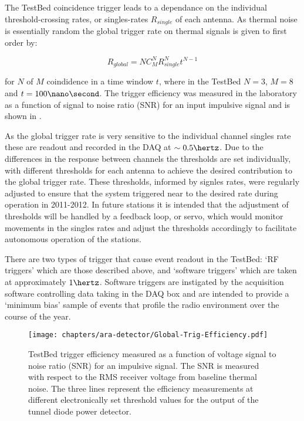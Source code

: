 The TestBed coincidence trigger leads to a dependance on the individual threshold-crossing rates, or singles-rates $R_{single}$ of each antenna. As thermal noise is essentially random the global trigger rate on thermal signals is given to first order by:


\begin{equation}
  R_{global} = N C^{N}_{M}R_{single}^{N}t^{N-1}
  \label{eq:ara-detector:TestBed:Trigger-Rate}
\end{equation}

\noindent for $N$ of $M$ coindidence in a time window $t$, where in the TestBed $N=3$, $M=8$ and $t=100\nano\second$. The trigger efficiency was measured in the laboratory as a function of signal to noise ratio (SNR) for an input impulsive signal and is shown in .

As the global trigger rate is very sensitive to the individual channel singles rate these are readout and recorded in the DAQ at $\sim 0.5 \hertz$. Due to the differences in the response between channels the thresholds are set individually, with different thresholds for each antenna to achieve the desired contribution to the global trigger rate. These thresholds, informed by signles rates, were regularly adjusted to ensure that the system triggered near to the desired rate during operation in 2011-2012. In future stations it is intended that the adjustment of thresholds will be handled by a feedback loop, or servo, which would monitor movements in the singles rates and adjust the thresholds accordingly to facilitate autonomous operation of the stations.

There are two types of trigger that cause event readout in the TestBed: `RF triggers' which are those described above, and `software triggers' which are taken at approximately $1 \hertz$. Software triggers are instigated by the acquisition software controlling data taking in the DAQ box and are intended to provide a `minimum bias' sample of events that profile the radio environment over the course of the year.

\begin{figure}[htpb]
  \centering
  \texttt{[image: chapters/ara-detector/Global-Trig-Efficiency.pdf]}
  \caption{TestBed trigger efficiency measured as a function of voltage signal to noise ratio (SNR) for an impulsive signal. The SNR is measured with respect to the RMS receiver voltage from baseline thermal noise. The three lines represent the efficiency measurements at different electronically set threshold values for the output of the tunnel diode power detector.}
  \label{fig:ara-detector:TestBed:Trigger-Efficiency}
\end{figure}


